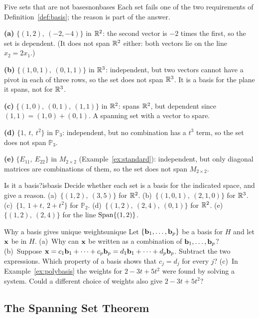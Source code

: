 \documentclass[11pt]{article}
\begin{document}
\begin{exmp}{Five sets that are not bases}{nonbases}
Each set fails one of the two requirements of Definition~\ref{def:basis}; the reason is part of the answer.

\textbf{(a)} $\{(1,2),\ (-2,-4)\}$ in $\mathbb{R}^2$: the second vector is $-2$ times the first, so the set is dependent. (It does not span $\mathbb{R}^2$ either: both vectors lie on the line $x_2=2x_1$.)

\textbf{(b)} $\{(1,0,1),\ (0,1,1)\}$ in $\mathbb{R}^3$: independent, but two vectors cannot have a pivot in each of three rows, so the set does not span $\mathbb{R}^3$. It is a basis for the plane it spans, not for $\mathbb{R}^3$.

\textbf{(c)} $\{(1,0),\ (0,1),\ (1,1)\}$ in $\mathbb{R}^2$: spans $\mathbb{R}^2$, but dependent since $(1,1)=(1,0)+(0,1)$. A spanning set with a vector to spare.

\textbf{(d)} $\{1,\ t,\ t^2\}$ in $\mathbb{P}_3$: independent, but no combination has a $t^3$ term, so the set does not span $\mathbb{P}_3$.

\textbf{(e)} $\{E_{11},\ E_{22}\}$ in $M_{2\times2}$ (Example~\ref{ex:standard}): independent, but only diagonal matrices are combinations of them, so the set does not span $M_{2\times2}$.
\end{exmp}

\begin{kc}{Is it a basis?}{isbasis}
Decide whether each set is a basis for the indicated space, and give a reason. (a)~$\{(1,2),\ (3,5)\}$ for $\mathbb{R}^2$. (b)~$\{(1,0,1),\ (2,1,0)\}$ for $\mathbb{R}^3$. (c)~$\{1,\ 1+t,\ 2+t^2\}$ for $\mathbb{P}_2$. (d)~$\{(1,2),\ (2,4),\ (0,1)\}$ for $\mathbb{R}^2$. (e)~$\{(1,2),\ (2,4)\}$ for the line $\operatorname{Span}\{(1,2)\}$.
\end{kc}

\begin{think}{Why a basis gives unique weights}{unique}
Let $\{\mathbf{b}_1,\dots,\mathbf{b}_p\}$ be a basis for $H$ and let $\mathbf{x}$ be in $H$. (a)~Why can $\mathbf{x}$ be written as a combination of $\mathbf{b}_1,\dots,\mathbf{b}_p$? (b)~Suppose $\mathbf{x}=c_1\mathbf{b}_1+\cdots+c_p\mathbf{b}_p=d_1\mathbf{b}_1+\cdots+d_p\mathbf{b}_p$. Subtract the two expressions. Which property of a basis shows that $c_j=d_j$ for every $j$? (c)~In Example~\ref{ex:polybasis} the weights for $2-3t+5t^2$ were found by solving a system. Could a different choice of weights also give $2-3t+5t^2$?
\end{think}

\subsection*{The Spanning Set Theorem}
\end{document}
